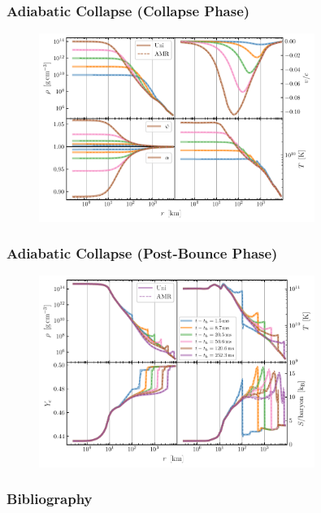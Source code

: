 \documentclass{beamer}
\begin{document}
\begin{frame}
\frametitle{Adiabatic Collapse (Collapse Phase)}

  \begin{figure}[htb!]
    \centering
    \includegraphics[width=0.8\textwidth]{fig.collapse.pdf}
  \end{figure}

\end{frame}

\begin{frame}
\frametitle{Adiabatic Collapse (Post-Bounce Phase)}

  \begin{figure}[htb!]
    \centering
    \includegraphics[width=0.8\textwidth]{fig.postBounce.pdf}
  \end{figure}

\end{frame}

\begin{frame}
\frametitle{Bibliography}

  \Fontvii
  

\end{frame}
\end{document}
